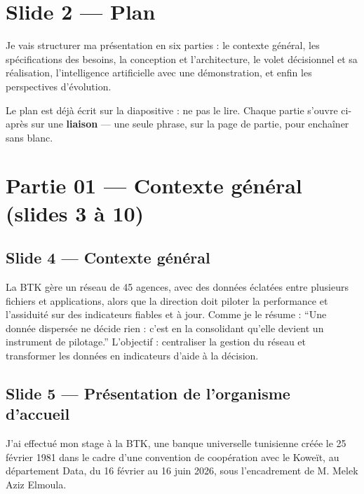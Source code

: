 \documentclass[a4paper,11pt]{article}
\begin{document}
\section*{Slide 2 --- Plan}

Je vais structurer ma présentation en six parties : le contexte général, les
spécifications des besoins, la conception et l'architecture, le volet
décisionnel et sa réalisation, l'intelligence artificielle avec une
démonstration, et enfin les perspectives d'évolution.

\begin{note}
\small Le plan est déjà écrit sur la diapositive : ne pas le lire. Chaque
partie s'ouvre ci-après sur une \textbf{liaison} --- une seule phrase, sur la
page de partie, pour enchaîner sans blanc.
\end{note}

\section*{Partie 01 --- Contexte général (slides 3 à 10)}


\subsection*{Slide 4 --- Contexte général}

La BTK gère un réseau de 45 agences, avec des données éclatées entre plusieurs
fichiers et applications, alors que la direction doit piloter la performance et
l'assiduité sur des indicateurs fiables et à jour. Comme je le résume :
\enquote{Une donnée dispersée ne décide rien : c'est en la consolidant qu'elle
devient un instrument de pilotage.} L'objectif : centraliser la gestion du
réseau et transformer les données en indicateurs d'aide à la décision.

\subsection*{Slide 5 --- Présentation de l'organisme d'accueil}

J'ai effectué mon stage à la BTK, une banque universelle tunisienne créée le
25 février 1981 dans le cadre d'une convention de coopération avec le Koweït,
au département Data, du 16 février au 16 juin 2026, sous l'encadrement de
M. Melek Aziz Elmoula.
\end{document}
